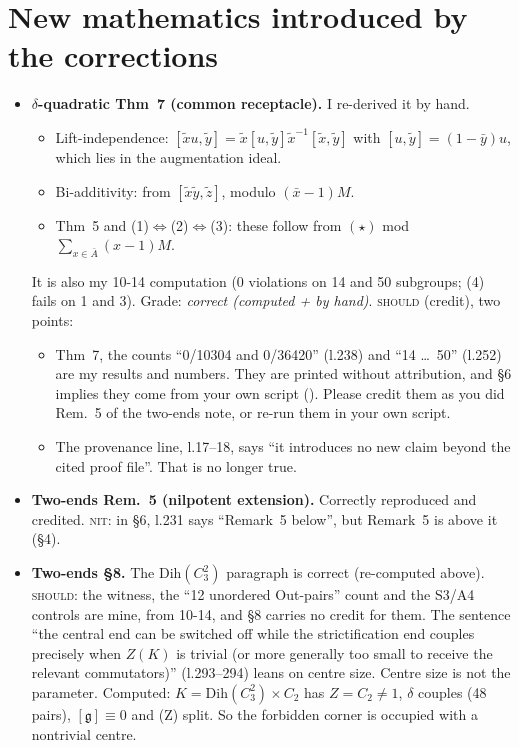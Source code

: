 \documentclass[10pt]{article}
\newcommand{\iss}[1]{\textsc{#1}}
\newcommand{\Abar}{\bar A}
\begin{document}
\section{New mathematics introduced by the corrections}
\begin{itemize}
\item \textbf{$\delta$-quadratic Thm~7 (common receptacle).} I re-derived it by hand.
  \begin{itemize}
  \item Lift-independence: $[\tilde xu,\tilde y]=\tilde x[u,\tilde y]\tilde x^{-1}[\tilde x,\tilde y]$ with $[u,\tilde y]=(1-\bar y)u$, which lies in the augmentation ideal.
  \item Bi-additivity: from $[\tilde x\tilde y,\tilde z]$, modulo $(\bar x-1)M$.
  \item Thm~5 and (1)$\Leftrightarrow$(2)$\Leftrightarrow$(3): these follow from $(\star)$ mod $\sum_{x\in\Abar}(x-1)M$.
  \end{itemize}
  It is also my 10-14 computation (0 violations on 14 and 50 subgroups; (4) fails on 1 and 3). Grade: \emph{correct (computed + by hand)}.
  \iss{should} (credit), two points:
  \begin{itemize}
  \item Thm~7, the counts ``0/10304 and 0/36420'' (l.238) and ``14 \dots\ 50'' (l.252) are my results and numbers. They are printed without attribution, and \S6 implies they come from your own script (). Please credit them as you did Rem.~5 of the two-ends note, or re-run them in your own script.
  \item The provenance line, l.17--18, says ``it introduces no new claim beyond the cited proof file''. That is no longer true.
  \end{itemize}
\item \textbf{Two-ends Rem.~5 (nilpotent extension).} Correctly reproduced and credited. \iss{nit}: in \S6, l.231 says ``Remark~5 below'', but Remark~5 is above it (\S4).
\item \textbf{Two-ends \S8.} The Dih$(C_3^2)$ paragraph is correct (re-computed above). \iss{should}: the witness, the ``12 unordered Out-pairs'' count and the S3/A4 controls are mine, from 10-14, and \S8 carries no credit for them.
  The sentence ``the central end can be switched off while the strictification end couples precisely when $Z(K)$ is trivial (or more generally too small to receive the relevant commutators)'' (l.293--294) leans on centre size. Centre size is not the parameter. Computed: $K=\mathrm{Dih}(C_3^2)\times C_2$ has $Z=C_2\neq1$, $\delta$ couples (48 pairs), $[\mathfrak g]\equiv0$ and (Z) split. So the forbidden corner is occupied with a nontrivial centre.

\end{itemize}
\end{document}
